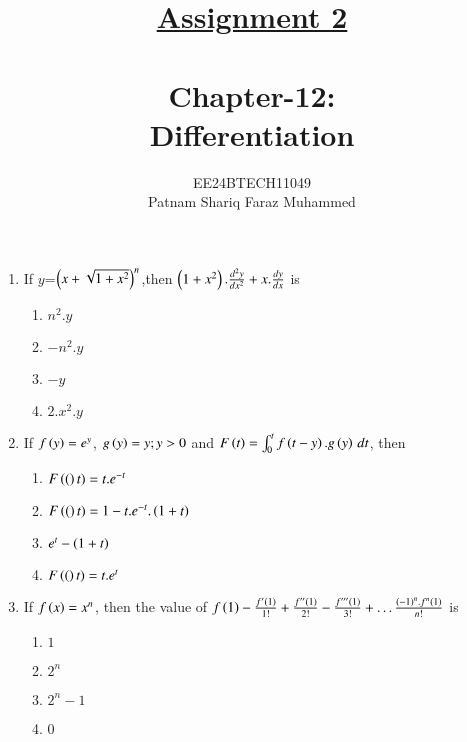 \documentclass[journal,12pt,twocolumn]{IEEEtran}
\theoremstyle{remark}
\begin{document}


\title{{\uline{Assignment 2 \\ } \\}Chapter-12: \\Differentiation}
\author{{EE24BTECH11049 \\ Patnam Shariq Faraz Muhammed}}

\maketitle
\newpage
\bigskip

\begin{enumerate}

	\item
	{If $y$=$\left(x+\sqrt{1+x^{2}}\right)^{n}$,then $\left(1+x^{2}\right).\frac{d^{2}y}{dx^{2}} + x.\frac{dy}{dx}$ is}

	\hfill{}

	\begin{enumerate}[label=(\alph*)]
		\item $n^{2}.y$
		\item $-n^{2}.y$
		\item $-y$
		\item $2.x^{2}.y$
	\end{enumerate}

	\item
	If $f\left(y\right)=e^{y}$, $g\left(y\right)=y; y>0$ and $F\left(t\right)= \int_{0}^{t}{f\left(t-y\right).g\left(y\right) \, dt}$, then

	\hfill{}

	\begin{enumerate}[label=(\alph*)]
		\item $F\left((\right)t)=t.e^{-t}$
		\item $F\left((\right)t)=1-t.e^{-t}.\left(1+t\right)$
		\item $e^{t}-\left(1+t\right)$
		\item $F\left((\right)t)=t.e^{t}$
	\end{enumerate}

	\item 
	If $f\left(x\right)=x^{n}$, then the value of $f\left(1\right)-\frac{f'\left(1\right)}{1!}+\frac{{f''\left(1\right)}}{2!}-\frac{{f'''\left(1\right)}}{3!}+\dots \frac{\left(-1\right)^n.f^{n}\left(1\right)}{n!}$ is

	\hfill{}
	
	\begin{enumerate}[label=(\alph*)]
		\item $1$
		\item $2^{n}$
		\item $2^{n}-1$
		\item $0$
	\end{enumerate}
	
\end{enumerate}
\end{document}

